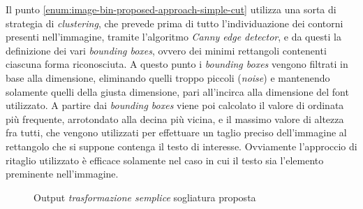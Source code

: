Il punto \ref{enum:image-bin-proposed-approach-simple-cut} utilizza una sorta di strategia di \textit{clustering}, che prevede prima di tutto l'individuazione dei contorni presenti nell'immagine, tramite l'algoritmo \textit{Canny edge detector}, e da questi la definizione dei vari \textit{bounding boxes}, ovvero dei minimi rettangoli contenenti ciascuna forma riconosciuta. A questo punto i \textit{bounding boxes} vengono filtrati in base alla dimensione, eliminando quelli troppo piccoli (\textit{noise}) e mantenendo solamente quelli della giusta dimensione, pari all'incirca alla dimensione del font utilizzato. A partire dai \textit{bounding boxes} viene poi calcolato il valore di ordinata pi\`u frequente, arrotondato alla decina pi\`u vicina, e il massimo valore di altezza fra tutti, che vengono utilizzati per effettuare un taglio preciso dell'immagine al rettangolo che si suppone contenga il testo di interesse. Ovviamente l'approccio di ritaglio utilizzato \`e efficace solamente nel caso in cui il testo sia l'elemento preminente nell'immagine.
\begin{figure}[H]
	\centering
	\caption{Output \textit{trasformazione semplice} sogliatura proposta}
	\label{fig:image-bin-proposed-approach-common}
\end{figure}
\setcounter{totalnumber}{1}

